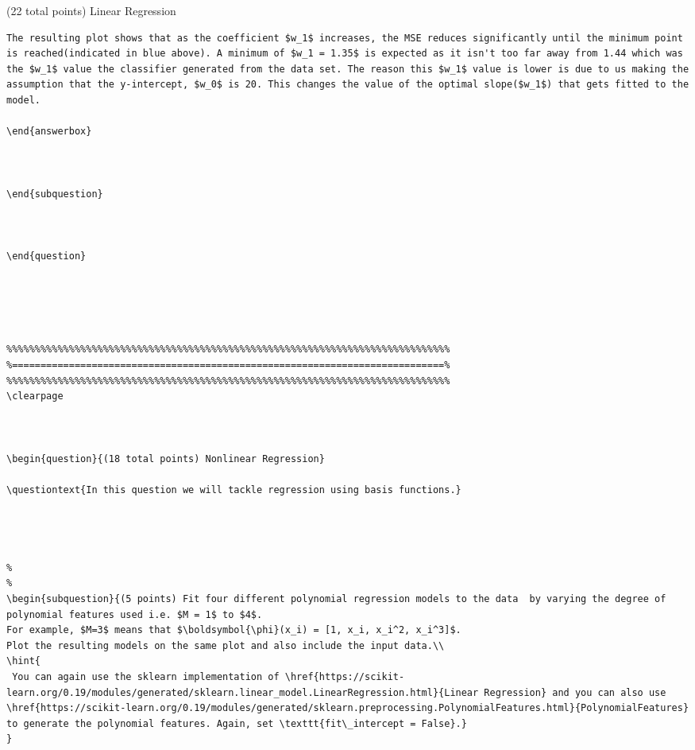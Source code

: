 \documentclass[12pt]{article}
\begin{document}
\begin{question}{(22 total points) Linear Regression}
\begin{subquestion}
\begin{answerbox}{20em}
\begin {verbatim}
The resulting plot shows that as the coefficient $w_1$ increases, the MSE reduces significantly until the minimum point is reached(indicated in blue above). A minimum of $w_1 = 1.35$ is expected as it isn't too far away from 1.44 which was the $w_1$ value the classifier generated from the data set. The reason this $w_1$ value is lower is due to us making the assumption that the y-intercept, $w_0$ is 20. This changes the value of the optimal slope($w_1$) that gets fitted to the model. 

\end{answerbox}



\end{subquestion}


 
\end{question}





\clearpage



\begin{question}{(18 total points) Nonlinear Regression}

\questiontext{In this question we will tackle regression using basis functions.}




%
%
\begin{subquestion}{(5 points) Fit four different polynomial regression models to the data  by varying the degree of polynomial features used i.e. $M = 1$ to $4$.
For example, $M=3$ means that $\boldsymbol{\phi}(x_i) = [1, x_i, x_i^2, x_i^3]$.
Plot the resulting models on the same plot and also include the input data.\\
\hint{
 You can again use the sklearn implementation of \href{https://scikit-learn.org/0.19/modules/generated/sklearn.linear_model.LinearRegression.html}{Linear Regression} and you can also use \href{https://scikit-learn.org/0.19/modules/generated/sklearn.preprocessing.PolynomialFeatures.html}{PolynomialFeatures} to generate the polynomial features. Again, set \texttt{fit\_intercept = False}.}
}



\end{verbatim}
\end{answerbox}
\end{subquestion}
\end{question}
\end{document}
